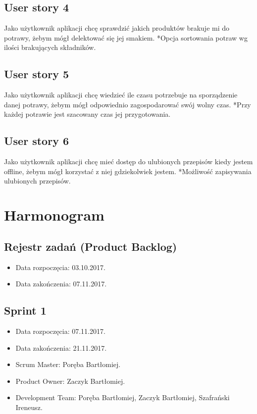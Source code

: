 \documentclass[a4paper]{article}
\begin{document}
	\subsection{User story 4}
	Jako użytkownik aplikacji chcę sprawdzić jakich produktów brakuje mi do potrawy, żebym mógł delektować się jej smakiem. \newline
	*Opcja sortowania potraw wg ilości brakujących składników.
	
	\subsection{User story 5}
	Jako użytkownik aplikacji chcę wiedzieć ile czasu potrzebuje na sporządzenie danej potrawy, żebym mógł odpowiednio zagospodarować swój wolny czas. \newline
	*Przy każdej potrawie jest szacowany czas jej przygotowania.
	
	\subsection{User story 6}
	Jako użytkownik aplikacji chcę mieć dostęp do ulubionych przepisów kiedy jestem offline, żebym mógł korzystać z niej gdziekolwiek jestem. \newline
	*Możliwość zapisywania ulubionych przepisów.
	
	
	
	\section{Harmonogram}
	
	\subsection{Rejestr zadań (Product Backlog)}
	
	\begin{itemize}
		\item Data rozpoczęcia: 03.10.2017.
		\item  Data zakończenia: 07.11.2017.
	\end{itemize}
	
	\subsection{Sprint 1}
	
	\begin{itemize}
		\item Data rozpoczęcia: 07.11.2017.
		\item Data zakończenia: 21.11.2017.
		\item Scrum Master: Poręba Bartłomiej.
		\item Product Owner: Zaczyk Bartłomiej.
		\item Development Team: Poręba Bartłomiej, Zaczyk Bartłomiej, Szafrański Ireneusz.
	\end{itemize}
	
\end{document}
